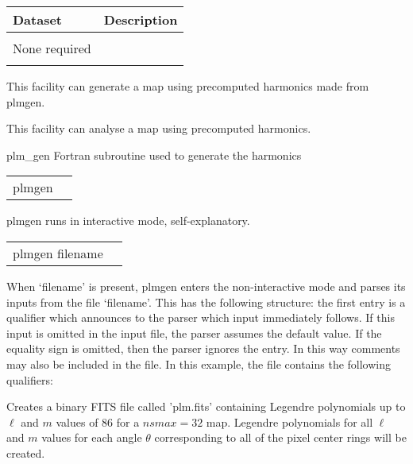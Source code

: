 \begin{datasets}
{
\begin{tabular}{p{0.3\hsize} p{0.35\hsize}} \hline  
  \textbf{Dataset} & \textbf{Description} \\ \hline
                   &                      \\ %
 None required & \\
                   &                      \\ \hline %
\end{tabular}
} 
\end{datasets}

\begin{support}
  \begin{sulist}{} %
  \item[\htmlref{synfast}{fac:synfast}] This \healpix facility can generate a map using precomputed harmonics made from plmgen.
  \item[\htmlref{anafast}{fac:anafast}] This \healpix facility can analyse a map using precomputed harmonics.
  \item[plm\_gen] Fortran subroutine used to generate the harmonics
  \end{sulist}
\end{support}

\begin{examples}{1}
{
\begin{tabular}{ll} %
plmgen  \\
\end{tabular}
}
{
plmgen runs in interactive mode, self-explanatory.
}
\end{examples}

\vfill\newpage

\begin{examples}{2}
{
\begin{tabular}{ll} %
plmgen  filename \\
\end{tabular}
}
{When `filename' is present, plmgen enters the non-interactive mode 
and parses
its inputs from the file `filename'. This has the following
structure: the first entry is a qualifier which announces to the parser
which input immediately follows. If this input is omitted in the
input file, the parser assumes the default value.
If the equality sign is omitted, then the parser ignores the entry.
In this way comments may also be included in the file.
In this example, the file contains the following qualifiers:\hfill\newline
{}
}

Creates a binary FITS file called 'plm.fits' containing Legendre polynomials 
up to $\ell$ and $m$ values of 86 for a $nsmax=32$ map. 
Legendre polynomials for all $\ell$ and $m$ 
values for each angle $\theta$ corresponding to all of the \healpix
pixel center rings will be 
created.
\end{examples}

